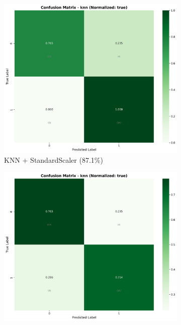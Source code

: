\begin{figure}[H]
\centering
\begin{subfigure}[b]{0.315\textwidth}
\centering
\includegraphics[width=1\textwidth]{Result/cleveland_dataset/confusion_matrices/knn_numeric_dataset_StandardScaler.png}
\caption{KNN + StandardScaler (87.1\%)}
\label{fig:knn_standardscaler_all}
\end{subfigure}
\hfill
\begin{subfigure}[b]{0.315\textwidth}
\centering
\includegraphics[width=1\textwidth]{Result/cleveland_dataset/confusion_matrices/knn_numeric_dataset_MinMaxScaler.png}

\end{subfigure}
\end{figure}
